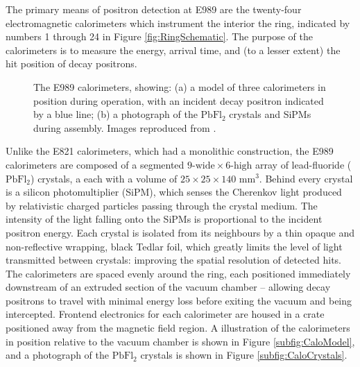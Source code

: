 The primary means of positron detection at E989 are the twenty-four electromagnetic calorimeters which instrument the interior the ring, indicated by numbers 1 through 24 in Figure \ref{fig:RingSchematic}. The purpose of the calorimeters is to measure the energy, arrival time, and (to a lesser extent) the hit position of decay positrons.

\begin{figure}[t!]
\centering{}
\hfill
{}
\caption{The E989 calorimeters, showing: (a) a model of three calorimeters in position during operation, with an incident decay positron indicated by a blue line; (b) a photograph of the $\text{PbFl}_{2}$ crystals and SiPMs during assembly. Images reproduced from \cite{CaloCommissioning}.}
\label{fig:Calos}
\end{figure} 

Unlike the E821 calorimeters, which had a monolithic construction, the E989 calorimeters are composed of a segmented $9\text{-wide}\times6\text{-high}$ array of lead-fluoride ($\text{PbFl}_{2}$) crystals, a each with a volume of $25\times25\times140$ $\text{mm}^3$. Behind every crystal is a silicon photomultiplier (SiPM), which senses the Cherenkov light produced by relativistic charged particles passing through the crystal medium. The intensity of the light falling onto the SiPMs is proportional to the incident positron energy. Each crystal is isolated from its neighbours by a thin opaque and non-reflective wrapping, black Tedlar foil, which greatly limits the level of light transmitted between crystals: improving the spatial resolution of detected hits. The calorimeters are spaced evenly around the ring, each positioned immediately downstream of an extruded section of the vacuum chamber -- allowing decay positrons to travel with minimal energy loss before exiting the vacuum and being intercepted. Frontend electronics for each calorimeter are housed in a crate positioned away from the magnetic field region. A illustration of the calorimeters in position relative to the vacuum chamber is shown in Figure \ref{subfig:CaloModel}, and a photograph of the $\text{PbFl}_{2}$ crystals is shown in Figure \ref{subfig:CaloCrystals}. 

